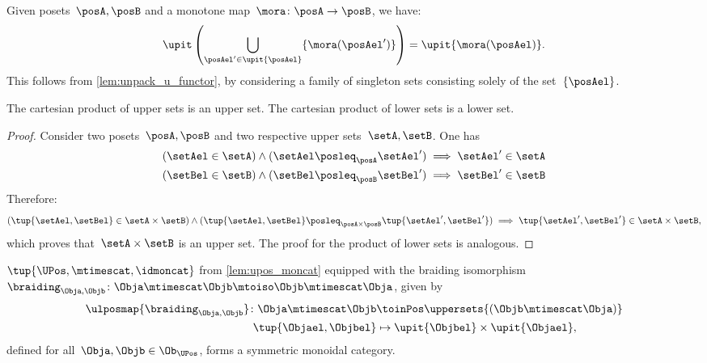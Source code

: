 \begin{remark}
    \label{rem:unpack_u_functor_bis}
    Given posets~$\posA,\posB$ and a monotone map~$\mora\colon \posA\to \posB$, we have:
    \begin{equation}
        \upit \left( \bigcup_{\posAel'\in \upit \{\posAel\}} \{\mora(\posAel')\}\right)=\upit \{\mora(\posAel)\}.
    \end{equation}
    This follows from \cref{lem:unpack_u_functor}, by considering a family of singleton sets consisting solely of the set~$\{\posAel\}$.
\end{remark}

\begin{lemma}
    The cartesian product of upper sets is an upper set.
    The cartesian product of lower sets is a lower set.
\end{lemma}
\begin{proof}
    Consider two posets~$\posA,\posB$ and two respective upper sets~$\setA,\setB$.
    One has
    \begin{equation*}
        \begin{aligned}
        (\setAel \in \setA)
            \wedge (\setAel \posleq_\posA \setAel') &\implies \setAel'\in \setA\\
            (\setBel \in \setB)\wedge (\setBel \posleq_\posB \setBel') &\implies \setBel'\in \setB
        \end{aligned}
    \end{equation*}
    Therefore:
    \begin{equation*}
    (\tup{\setAel,\setBel} \in \setA\times \setB)
        \wedge (\tup{\setAel,\setBel} \posleq_{\posA \times \posB} \tup{\setAel',\setBel'}) \implies \tup{\setAel',\setBel'}\in \setA \times \setB,
    \end{equation*}
    which proves that~$\setA\times \setB$ is an upper set.
    The proof for the product of lower sets is analogous.
\end{proof}
\begin{lemma}
    \label{lem:UPos-is-sym-mon}
    $\tup{\UPos,\mtimescat,\idmoncat}$ from \cref{lem:upos_moncat} equipped with the braiding isomorphism~$\braiding_{\Obja,\Objb}\colon \Obja \mtimescat \Objb \mtoiso \Objb \mtimescat \Obja$, given by
    \begin{equation}
        \label{eq:Upos-braiding}
        \begin{aligned}
            \ulposmap{\braiding_{\Obja,\Objb}}\colon \Obja \mtimescat \Objb &\toinPos \uppersets{(\Objb \mtimescat \Obja)}\\
            \tup{\Objael,\Objbel}&\mapsto \upit\{\Objbel\} \times \upit\{\Objael\},
        \end{aligned}
    \end{equation}
    defined for all~$\Obja,\Objb\in \Ob_{\UPos}$, forms a symmetric monoidal category.
\end{lemma}
